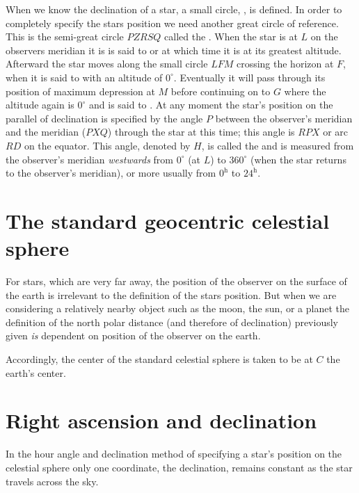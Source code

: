 When we know the declination of a star, a small circle, {}, is defined. In order to completely
specify the stars position we need another great circle of
reference. This is the semi-great circle $PZRSQ$ called the
{}. When the star is at $L$ on the observers
meridian it is is said to {} or {} at which
time it is at its greatest altitude. Afterward the star moves along
the small circle $LFM$ crossing the horizon at $F$, when it is said to
{} with an altitude of $0^\circ$. Eventually it will pass through
its position of maximum depression at $M$ before continuing on to $G$
where the altitude again is $0^\circ$ and is said to {}. At
any moment the star's position on the parallel of declination is
specified by the angle $P$ between the observer's meridian and the
meridian ($PXQ$) through the star at this time; this angle is $RPX$ or
arc $RD$ on the equator. This angle, denoted by $H$, is called the
{} and is measured from the observer's meridian
\textit{westwards} from $0^\circ$ (at $L$) to $360^\circ$ (when the star
returns to the observer's meridian), or more usually from $0^{\mathrm{h}}$ to 
$24^{\mathrm{h}}$. 

\section{The standard geocentric celestial sphere}


For stars, which are very far away, the position of the observer on
the surface of the earth is irrelevant to the definition of the stars
position. But when we are considering a relatively nearby object such
as the moon, the sun, or a planet the definition of the north polar
distance (and therefore of declination) previously given {\it is}
dependent on position of the observer on the earth. 

Accordingly, the center of the standard celestial sphere is taken to
be at $C$ the earth's center. 

\section{Right ascension and declination}

In the hour angle and declination method of specifying a star's
position on the celestial sphere only one coordinate, the declination,
remains constant as the star travels across the sky. 

